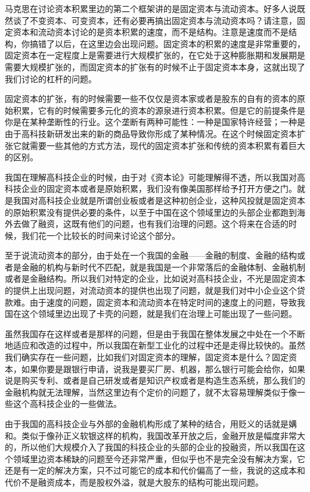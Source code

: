 \documentclass[UTF8, 12pt, a4paper]{ctexrep}
\begin{document}
马克思在讨论资本积累里边的第二个框架讲的是固定资本与流动资本。好多人说既然谈了不变资本、可变资本，还有必要再搞出固定资本与流动资本吗？请注意，固定资本和流动资本讨论的是资本积累的速度，而不是结构。注意是速度而不是结构，你搞错了以后，在这里边会出现问题。固定资本的积累的速度是非常重要的，固定资本在一定程度上是需要进行大规模扩张的，在它处于这种膨胀期和发展期是需要大规模扩张的，而固定资本的扩张有的时候不止于固定资本本身，这就出现了我们讨论的杠杆的问题。

固定资本的扩张，有的时候需要一些不仅仅是资本家或者是股东的自有的资本的原始积累，它有的时候需要多元化的资本的源泉进行资本积累。但是它的前提条件是你是在某种垄断性的行业。这个垄断有两种可能性：一种是国家特许经营；一种是由于高科技新研发出来的新的商品导致你形成了某种情况。在这个时候固定资本扩张它就需要一些其他的方式方法，现代的固定资本扩张和传统的资本积累有着巨大的区别。

我国在理解高科技企业的时候，由于对《资本论》可能理解得不透，所以我国对高科技企业的固定资本或者是原始积累，我们没有像美国那样给予打开方便之门。就是我国对高科技企业就是所谓创业板或者是这种初创企业，这种风投就是固定资本的原始积累没有提供必要的条件，以至于中国在这个领域里边的头部企业都跑到海外去做了融资，这既有他们的问题，也有我们治理的问题。这个将来在合适的时候，我们花一个比较长的时间来讨论这个部分。

至于说流动资本的部分，由于处在一个我国的金融——金融的制度、金融的结构或者是金融的机构与新时代不匹配，就是我国是一个非常落后的金融体制、金融机制或者是金融结构。所以我们对特定的企业，比如说对高科技企业，不光是固定资本的提供上出现问题，对流动资本的提供也出现了问题，就是我们对中小企业这个贷款难。由于速度的问题，固定资本和流动资本在特定时间的速度上的问题，导致我国在这个领域里边出现了卡壳的问题，就是我们在治理上可能出现了一些问题。

虽然我国存在这样或者是那样的问题，但是由于我国在整体发展之中处在一个不断地适应和改造的过程中，所以我国在新型工业化的过程中还是走得比较快的。虽然我们确实存在一些问题，比如我们对固定资本的理解，固定资本是什么？固定资本，如果你要是跟银行申请，说我是要买厂房、机器，那么银行可能会给你，如果说是购买专利、或者是自己研发或者是知识产权或者是构造生态系统，那么我们的金融机构就无法理解，当然这里边有个定价的问题了，就不太容易理解类似于像一些这个高科技企业的一些做法。

由于我国的高科技企业与外部的金融机构形成了某种的结合，用贬义的话就是媾和。类似于像孙正义软银这样的机构，我国改革开放之后，金融开放是幅度非常大的，所以他们大规模介入了我国的科技企业的头部的企业的投融资，所以我国在这个领域里边资本稀缺的问题至今还非常严重，但似乎也不是完全没有解决方案，它还是有一定的解决方案，只不过可能它的成本和代价偏高了一些，我说的这成本和代价不是融资成本，而是股权外溢，就是大股东的结构可能出现问题。
\end{document}
